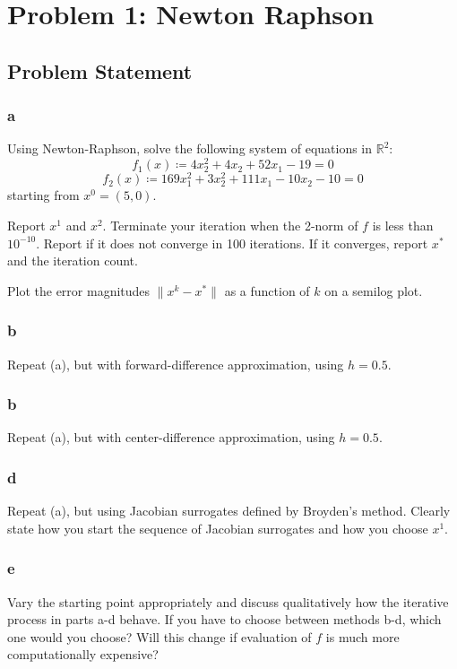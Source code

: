 \documentclass[11pt]{report}
\theoremstyle{definition}
\begin{document}
\section*{Problem 1: Newton Raphson}
\subsection*{Problem Statement}
\subsubsection*{a}
Using Newton-Raphson, solve the following system of equations in $\mathbb{R}^2$:
\[ f_1(x) \coloneqq 4x_2^2+4x_2+52x_1-19 = 0 \]
\[ f_2(x) \coloneqq 169x_1^2 + 3x_2^2 + 111x_1 - 10x_2 - 10 = 0 \]
starting from $x^0 = (5, 0)$.

Report $x^1$ and $x^2$. Terminate your iteration when the 2-norm of $f$ is less
than $10^{-10}$.  Report if it does not converge in 100 iterations. If it
converges, report $x^*$ and the iteration count.

Plot the error magnitudes $\|x^k-x^*\|$ as a function of $k$ on a semilog plot.

\subsubsection*{b}
Repeat (a), but with forward-difference approximation, using $h=0.5$.

\subsubsection*{b}
Repeat (a), but with center-difference approximation, using $h=0.5$.

\subsubsection*{d}
Repeat (a), but using Jacobian surrogates defined by Broyden's method. Clearly
state how you start the sequence of Jacobian surrogates and how you choose
$x^1$.

\subsubsection*{e}
Vary the starting point appropriately and discuss qualitatively how the
iterative process in parts a-d behave. If you have to choose between methods
b-d, which one would you choose? Will this change if evaluation of $f$ is much
more computationally expensive?
\end{document}
